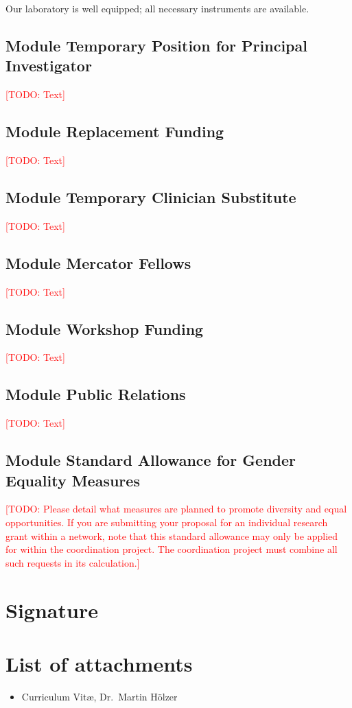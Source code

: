 \documentclass[ngerman,firsttime]{dfgproposal}
\newcommand{\todo}[1]{\xspace{\textcolor{red}{[TODO: #1]}}\xspace}
\begin{document}
	Our laboratory is well equipped; all necessary instruments are available.
	
	
	
	\vspace*{2cm}\todo{The following are additional/other modules one might want to apply for. Otherwise, just delete/comment}
	
	\subsection{Module Temporary Position for Principal Investigator}
	\todo{Text}
	
	\subsection{Module Replacement Funding}
	\todo{Text}
	
	\subsection{Module Temporary Clinician Substitute}
	\todo{Text}
	
	\subsection{Module Mercator Fellows}
	\todo{Text}
	
	\subsection{Module Workshop Funding}
	\todo{Text}
	
	\subsection{Module Public Relations}
	\todo{Text}
	
	\subsection{Module Standard Allowance for Gender Equality Measures}
	\todo{Please detail what measures are planned to promote diversity and equal opportunities.  If you are submitting your proposal for an individual research grant within a network, note that this standard allowance may only be applied for within the coordination project. The coordination project must combine all such requests in its calculation.}
	
	\section{Signature}
	
	
	\section{List of attachments}
	\begin{itemize}
		\item Curriculum Vit\ae, Dr.\ Martin H\"olzer
	\end{itemize}
	
	
	
\end{document}
